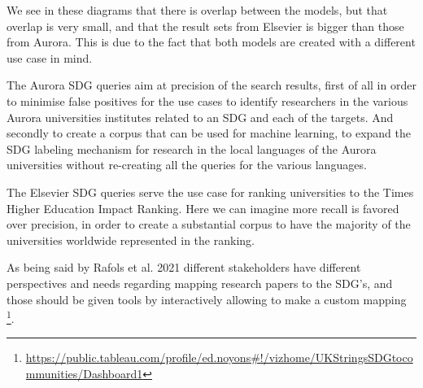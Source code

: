 \documentclass{article}
\begin{document}
We see in these diagrams that there is overlap between the models, but that overlap is very small, and that the result sets from Elsevier is bigger than those from Aurora. This is due to the fact that both models are created with a different use case in mind.

The Aurora SDG queries aim at precision of the search results, first of all in order to minimise false positives for the use cases to identify researchers in the various Aurora universities institutes related to an SDG and each of the targets. And secondly to create a corpus that can be used for machine learning, to expand the SDG labeling mechanism for research in the local languages of the Aurora universities without re-creating all the queries for the various languages.

The Elsevier SDG queries serve the use case for ranking universities to the Times Higher Education Impact Ranking. Here we can imagine more recall is favored over precision, in order to create a substantial corpus to have the majority of the universities worldwide represented in the ranking.

As being said by Rafols et al. 2021 \cite{rafols_visualising_2021} different stakeholders have different perspectives and needs regarding mapping research papers to the SDG's, and those should be given tools by interactively allowing to make a custom mapping \footnote{\url{https://public.tableau.com/profile/ed.noyons\#!/vizhome/UKStringsSDGtocommunities/Dashboard1}}.

\end{document}
